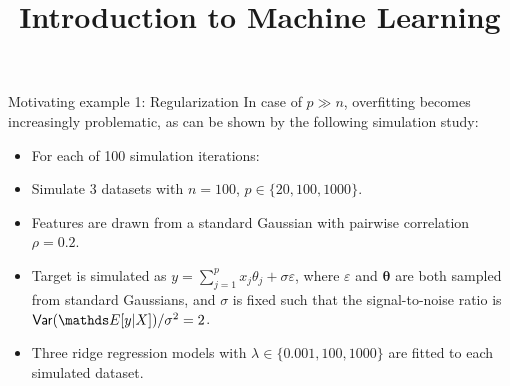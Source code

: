 \documentclass[11pt,compress,t,notes=noshow, xcolor=table]{beamer}
\title{Introduction to Machine Learning}
\date{}
\begin{document}

  \begin{vbframe}{Motivating example 1: Regularization}
  In case of $p \gg n$,  overfitting becomes increasingly problematic, as can be shown by the following simulation study:
  
  \begin{itemize}
    \item For each of 100 simulation iterations:
    \item Simulate 3 datasets with $n=100$, $p \in \{ 20, 100, 1000 \}$.
    \item Features are drawn from a standard Gaussian with pairwise correlation $\rho=0.2$.
      \item Target is simulated as
    $ y = \sum_{j=1}^p x_j \theta_j + \sigma\varepsilon $, where $\varepsilon$ and $\bm{\theta}$ are both sampled from standard Gaussians, and $\sigma$ is fixed such that the signal-to-noise ratio is $\var (\E[y|X]) / \sigma^2 = 2$.
    \item Three ridge regression models with $\lambda \in \{ 0.001, 100, 1000 \}$ are fitted to each simulated dataset.
  \end{itemize}
  
  \framebreak
  

\end{vbframe}
\end{document}

